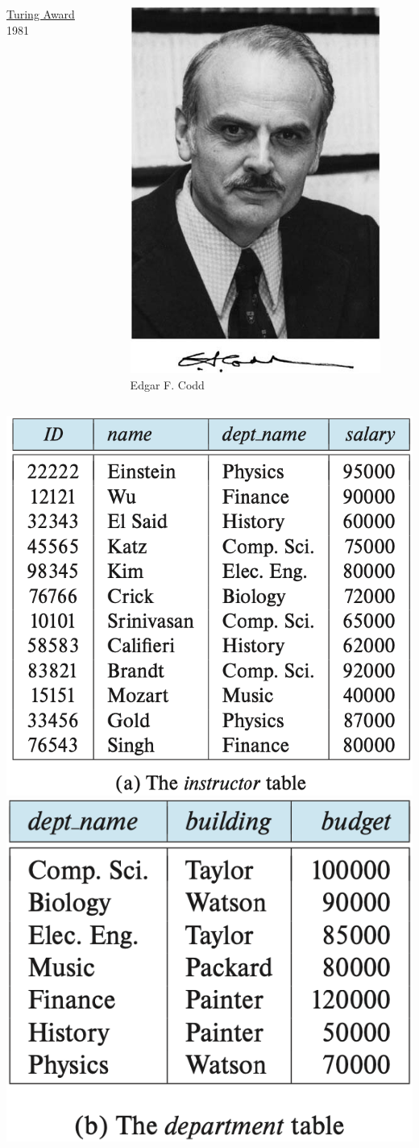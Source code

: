 \documentclass[aspectratio=169, 14pt]{beamer}
\begin{document}
\begin{frame}[fragile]
\begin{columns}
		{\tiny \href{https://zh.wikipedia.org/zh-cn/%E5%9B%BE%E7%81%B5%E5%A5%96}{Turing Award} 1981}
		\begin{figure}
			\includegraphics[width=.8\textwidth]{image/codd}
			\caption*{Edgar F. Codd}
		\end{figure}
	\end{columns}
\end{frame}

\begin{frame}

	\includegraphics[width=.475\textwidth]{table/instructor}
	\includegraphics[width=.475\textwidth]{table/department}
\end{frame}
\end{document}
